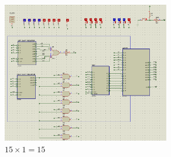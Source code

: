 \documentclass[12pt,onecolumn,a4paper,fleqn]{article}
\begin{document}
	\begin{figure}[H]
		\centering
		\includegraphics[width=0.65\textwidth]{source/test4.png}
		\caption{$15 \times 1 = 15$}
	\end{figure}
\end{document}
